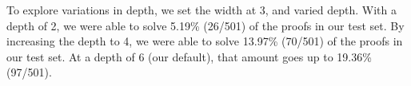 \documentclass[sigplan,screen]{acmart}
\renewcommand{\>}{\quad}
\begin{document}
To explore variations in depth, we set the width at 3, and varied depth.
With a depth of 2,
  we were able to solve 5.19\% (26/501) of the proofs in our test set.
By increasing the depth to 4,
  we were able to solve 13.97\% (70/501) of the proofs in our test set.
At a depth of 6 (our default),
  that amount goes up to 19.36\% (97/501).
 
\end{document}

